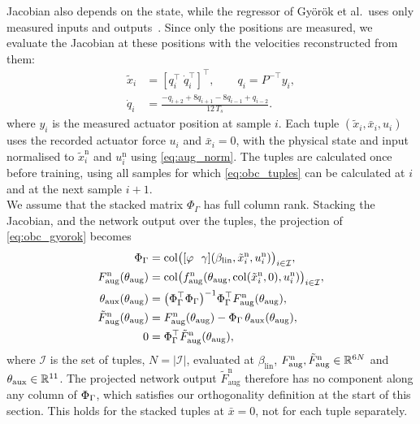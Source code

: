  Jacobian also depends on the state, while the regressor of
Gy\"or\"ok et al.\ uses only measured inputs and
outputs~\cite[Eqs.~(1), (2)]{gyorok2026obc}.
Since only the positions are measured, we evaluate the Jacobian at these
positions with the velocities reconstructed from them:
\begin{equation}
\begin{aligned}
 \tilde x_i&=[q_i^\top\;\dot q_i^\top]^\top,\qquad q_i=P^{-\top}y_i,\\
 \dot q_i&=\frac{-q_{i+2}+8q_{i+1}-8q_{i-1}+q_{i-2}}{12\,T_s}.
\end{aligned}
\label{eq:obc_tuples}
\end{equation}
where $y_i$ is the measured actuator position at sample $i$.
Each tuple $(\tilde x_i,\bar x_i,u_i)$ uses the recorded actuator 
force $u_i$ and $\bar x_i=0$,
with the physical state and input normalised to
$\tilde x^{\mathrm n}_i$ and $u^{\mathrm n}_i$
using \eqref{eq:aug_norm}.
The tuples are calculated once before training, using all samples for which
\eqref{eq:obc_tuples} can be calculated at $i$ and at the next sample $i+1$.
\\
We assume that the stacked matrix $\Phi_\Gamma$ has full column rank.
Stacking the Jacobian,  and the network output over the tuples, the projection
of \eqref{eq:obc_gyorok} becomes
\begin{equation}
\begin{aligned}
 \Phi_\Gamma
 &=\operatorname{col}\bigl([\varphi\ \ \gamma](\beta_{\mathrm{lin}},\tilde x^{\mathrm n}_i,u^{\mathrm n}_i)\bigr)_{i\in\mathcal I},\\
 F^{\mathrm n}_{\mathrm{aug}}(\theta_{\mathrm{aug}})
 &=\operatorname{col}\bigl(f^{\mathrm n}_{\mathrm{aug}}(\theta_{\mathrm{aug}},\operatorname{col}(\tilde x^{\mathrm n}_i,0),u^{\mathrm n}_i)\bigr)_{i\in\mathcal I},\\
 \theta_{\mathrm{aux}}(\theta_{\mathrm{aug}})
 &=\bigl(\Phi_\Gamma^\top\Phi_\Gamma\bigr)^{-1}\Phi_\Gamma^\top F^{\mathrm n}_{\mathrm{aug}}(\theta_{\mathrm{aug}}),\\
 \tilde F^{\mathrm n}_{\mathrm{aug}}(\theta_{\mathrm{aug}})
 &=F^{\mathrm n}_{\mathrm{aug}}(\theta_{\mathrm{aug}})-\Phi_\Gamma\,\theta_{\mathrm{aux}}(\theta_{\mathrm{aug}}),\\
 0&=\Phi_\Gamma^{\top}\tilde F^{\mathrm n}_{\mathrm{aug}}(\theta_{\mathrm{aug}}),
\end{aligned}
\label{eq:obc_coef}
\end{equation}
where $\mathcal I$ is the set of tuples, $N=|\mathcal I|$,
evaluated at $\beta_{\mathrm{lin}}$,
$F^{\mathrm n}_{\mathrm{aug}},\tilde F^{\mathrm n}_{\mathrm{aug}}\in\mathbb{R}^{6N}$
and $\theta_{\mathrm{aux}}\in\mathbb{R}^{11}$.
The projected network output $\tilde F^{\mathrm n}_{\mathrm{aug}}$ therefore
has no component along any column of $\Phi_\Gamma$, which satisfies our orthogonality
definition at the start of this section.
This holds for the stacked tuples at $\bar x=0$, not for each tuple separately.

